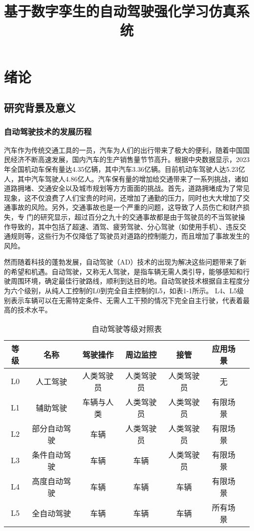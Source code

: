 \title{基于数字孪生的自动驾驶强化学习仿真系统}

\chapter{绪论}



\section{研究背景及意义}

\subsection{自动驾驶技术的发展历程}

汽车作为传统交通工具的一员，汽车为人们的出行带来了极大的便利，随着中国国民经济不断高速发展，国内汽车的生产销售量节节高升。根据中央数据显示，2023年全国机动车保有量达4.35亿辆，其中汽车3.36亿辆。目前机动车驾驶人达5.23亿人，其中汽车驾驶人4.86亿人。汽车保有量的增加给交通带来了一系列挑战，诸如道路拥堵、交通安全以及城市规划等方方面面的挑战。首先，道路拥堵成为了常见现象，这不仅浪费了人们宝贵的时间，还增加了通勤的压力，同时也大大增加了交通事故的风险。另外，交通事故也是一个严重的问题，这导致了人员伤亡和财产损失，专
门的研究显示，超过百分之九十的交通事故都是由于驾驶员的不当驾驶操作导致的，其中包括了超速、酒驾、疲劳驾驶、分心驾驶（如使用手机）、违反交通规则等，这些行为不仅降低了驾驶员对道路的控制能力\cite{关鑫2023自动驾驶安全挑战}，而且增加了事故发生的风险。

然而随着科技的蓬勃发展，自动驾驶（AD）技术的出现为解决这些问题带来了新的希望和机遇。自动驾驶，又称无人驾驶，是指车辆无需人类引导，能够感知和行驶周围环境，确定最佳行驶路线，顺利到达目的地。自动驾驶技术根据自主程度分为六个级别，从纯人工控制的L0到完全自主控制的L5，如表1-1所示。 L4、L5级别表示车辆可以在无需特定条件、无需人工干预的情况下完全自主行驶，代表着最高的技术水平\cite{1023549446.nh}。


\begin{table}[htbp]
	\centering
	\caption{自动驾驶等级对照表}
	\label{tab:driving-levels}
	\begin{tabular}{ccccccc}
		\toprule
		\textbf{等级} & \textbf{名称} & \textbf{驾驶操作} & \textbf{周边监控} & \textbf{接管} & \textbf{应用场景} \\
		\midrule
		L0   & 人工驾驶      & 人类驾驶员 & 人类驾驶员 & 人类驾驶员 & 无 \\
		L1   & 辅助驾驶      & 车辆与人类 & 人类驾驶员 & 人类驾驶员 & 有限场景 \\
		L2   & 部分自动驾驶  & 车辆       & 人类驾驶员 & 人类驾驶员 & 有限场景 \\
		L3   & 条件自动驾驶  & 车辆       & 车辆      & 人类驾驶员  & 有限场景 \\
		L4   & 高度自动驾驶  & 车辆       & 车辆      & 车辆       & 有限场景 \\
		L5   & 全自动驾驶    & 车辆       & 车辆      & 车辆       & 所有场景 \\
		\bottomrule
	\end{tabular}
\end{table}


